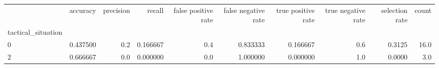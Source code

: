 \begin{tabular}{lrrrrrrrrr}
\toprule
{} &  accuracy &  precision &    recall &  false positive rate &  false negative rate &  true positive rate &  true negative rate &  selection rate &  count \\
tactical\_situation &           &            &           &                      &                      &                     &                     &                 &        \\
\midrule
0                  &  0.437500 &        0.2 &  0.166667 &                  0.4 &             0.833333 &            0.166667 &                 0.6 &          0.3125 &   16.0 \\
2                  &  0.666667 &        0.0 &  0.000000 &                  0.0 &             1.000000 &            0.000000 &                 1.0 &          0.0000 &    3.0 \\
\bottomrule
\end{tabular}
